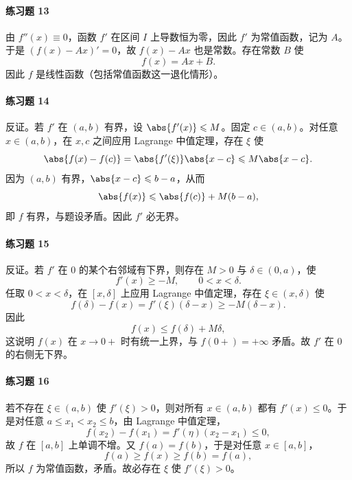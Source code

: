 \paragraph{练习题 13}
\begin{xsolution}
由 $f''(x)\equiv0$，函数 $f'$ 在区间 $I$ 上导数恒为零，因此 $f'$ 为常值函数，记为 $A$。于是 $(f(x)-Ax)'=0$，故 $f(x)-Ax$ 也是常数。存在常数 $B$ 使
\[
  f(x)=Ax+B.
\]
因此 $f$ 是线性函数（包括常值函数这一退化情形）。
\end{xsolution}

\paragraph{练习题 14}
\begin{xsolution}
反证。若 $f'$ 在 $(a,b)$ 有界，设 $\abs{f'(x)}\leqslant M$。固定 $c\in(a,b)$。对任意 $x\in(a,b)$，在 $x,c$ 之间应用 Lagrange 中值定理，存在 $\xi$ 使
\[
  \abs{f(x)-f(c)}=\abs{f'(\xi)}\abs{x-c}
  \leqslant M\abs{x-c}.
\]
因为 $(a,b)$ 有界，$\abs{x-c}\leqslant b-a$，从而
\[
  \abs{f(x)}\leqslant\abs{f(c)}+M(b-a),
\]
即 $f$ 有界，与题设矛盾。因此 $f'$ 必无界。
\end{xsolution}

\paragraph{练习题 15}
\begin{xsolution}
反证。若 $f'$ 在 $0$ 的某个右邻域有下界，则存在 $M>0$ 与 $\delta\in(0,a)$，使
\[
  f'(x)\geqslant-M,
  \qquad0<x<\delta.
\]
任取 $0<x<\delta$，在 $[x,\delta]$ 上应用 Lagrange 中值定理，存在 $\xi\in(x,\delta)$ 使
\[
  f(\delta)-f(x)=f'(\xi)(\delta-x)\geqslant-M(\delta-x).
\]
因此
\[
  f(x)\leqslant f(\delta)+M\delta,
\]
这说明 $f(x)$ 在 $x\to0+$ 时有统一上界，与 $f(0+)=+\infty$ 矛盾。故 $f'$ 在 $0$ 的右侧无下界。
\end{xsolution}

\paragraph{练习题 16}
\begin{xsolution}
若不存在 $\xi\in(a,b)$ 使 $f'(\xi)>0$，则对所有 $x\in(a,b)$ 都有 $f'(x)\leqslant0$。于是对任意 $a\leqslant x_1<x_2\leqslant b$，由 Lagrange 中值定理，
\[
  f(x_2)-f(x_1)=f'(\eta)(x_2-x_1)\leqslant0,
\]
故 $f$ 在 $[a,b]$ 上单调不增。又 $f(a)=f(b)$，于是对任意 $x\in[a,b]$，
\[
  f(a)\geqslant f(x)\geqslant f(b)=f(a),
\]
所以 $f$ 为常值函数，矛盾。故必存在 $\xi$ 使 $f'(\xi)>0$。
\end{xsolution}

